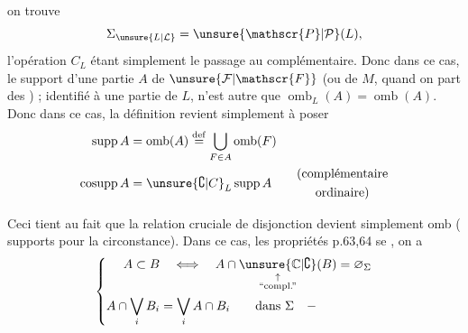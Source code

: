 
on trouve
\[
\Sigma_{\unsure{L|\mathcal{L}}}=\unsure{\mathscr{P}|\mathcal{P}}(L),
\]
l'opération $C_L$ étant simplement le passage au complémentaire. Donc dans ce cas, le support d'une partie $A$ de $\unsure{\mathcal{F}|\mathscr{F}}$ (ou de $M$, quand on part des ) ; identifié à une partie de $L$, n'est autre que $\operatorname{omb}_L(A)=\operatorname{omb}(A)$. Donc dans ce cas, la définition revient simplement à poser
\[
\begin{aligned}
\operatorname{supp}A&=\operatorname{omb}(A)\overset{\mathrm{def}}{=}\bigcup_{F\in A}\operatorname{omb}(F)\\
\operatorname{cosupp}A&=\unsure{\complement|C}_L\operatorname{supp}A
\qquad\begin{gathered}\text{(complémentaire}\\\text{ordinaire)}\end{gathered}
\end{aligned}
\]

Ceci tient au fait que la relation cruciale de disjonction devient simplement
omb ( supports pour la circonstance). Dans ce cas, les propriétés p.63,64 se , on a
\[
\left\{\begin{aligned}
A\subset B&\quad\Longleftrightarrow\quad A\cap\underset{\substack{\uparrow\\\text{``compl.''}}}{\unsure{\mathbb{C}|\complement}}(B)=\varnothing_\Sigma\\
A\cap\bigvee_i B_i&=\bigvee_i A\cap B_i\qquad\text{dans }\Sigma\quad-
\end{aligned}\right.
\]

